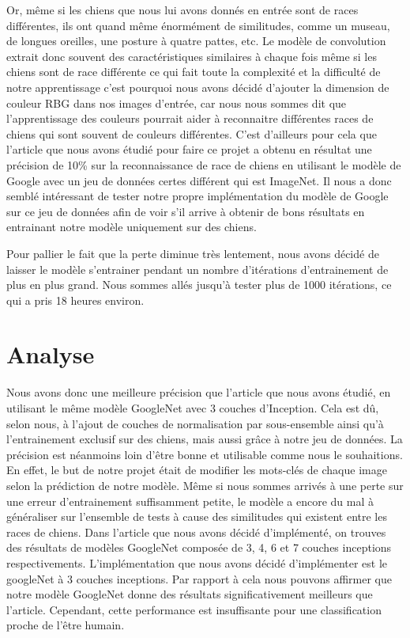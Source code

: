 \documentclass{article}
\begin{document}
Or, même si les chiens que nous lui avons donnés en entrée sont de races
différentes, ils ont quand même énormément de similitudes, comme un museau, de
longues oreilles, une posture à quatre pattes, etc. Le modèle de convolution
extrait donc souvent des caractéristiques similaires à chaque fois même si les
chiens sont de race différente ce qui fait toute la complexité et la difficulté
de notre apprentissage c’est pourquoi nous avons décidé d’ajouter la dimension
de couleur RBG dans nos images d’entrée, car nous nous sommes dit que
l’apprentissage des couleurs pourrait aider à reconnaitre différentes races de
chiens qui sont souvent de couleurs différentes. C’est d’ailleurs pour cela que
l’article que nous avons étudié pour faire ce projet a obtenu en résultat une
précision de 10\% sur la reconnaissance de race de chiens en utilisant le modèle
de Google avec un jeu de données certes différent qui est ImageNet. Il nous a
donc semblé intéressant de tester notre propre implémentation du modèle de
Google sur ce jeu de données afin de voir s'il arrive à obtenir de bons résultats
en entrainant notre modèle uniquement sur des chiens.

Pour pallier le fait que la perte diminue très lentement, nous avons décidé de
laisser le modèle s’entrainer pendant un nombre d’itérations d’entrainement de
plus en plus grand. Nous sommes allés jusqu’à tester plus de 1000 itérations, ce
qui a pris 18 heures environ.

\section{Analyse}
Nous avons donc une meilleure précision que l’article que nous avons étudié,
en utilisant le même modèle GoogleNet avec 3 couches d'Inception. Cela est dû,
selon nous, à l’ajout de couches de normalisation par sous-ensemble ainsi qu’à
l’entrainement exclusif sur des chiens, mais aussi grâce à notre jeu de données.
La précision est néanmoins loin d’être bonne et utilisable comme nous le
souhaitions. En effet, le but de notre projet était de modifier les mots-clés de
chaque image selon la prédiction de notre modèle. Même si nous sommes arrivés à
une perte sur une erreur d’entrainement suffisamment petite, le modèle a encore
du mal à généraliser sur l’ensemble de tests à cause des similitudes qui
existent entre les races de chiens. Dans l'article que nous avons décidé
d'implémenté, on trouves des résultats de modèles GoogleNet composée de 3, 4, 6
et 7 couches inceptions respectivements. L'implémentation que nous avons décidé
d'implémenter est le googleNet à 3 couches inceptions. Par rapport à cela nous
pouvons affirmer que notre modèle GoogleNet donne des résultats
significativement meilleurs que l'article. Cependant, cette performance est
insuffisante pour une classification proche de l'être humain.
\end{document}
